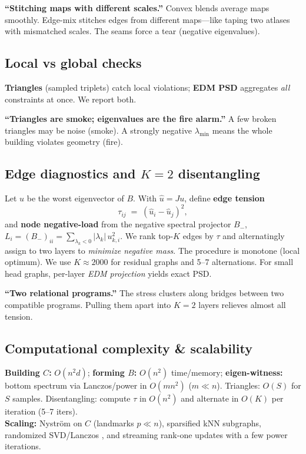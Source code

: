 \documentclass[11pt]{article}
\newcommand{\1}{\mathbf{1}}
\begin{document}
\begin{tcolorbox}[colback=blue!3,colframe=blue!40!black,title=Intuition (for \S\ref{sec:mix})]
\textbf{``Stitching maps with different scales.''} Convex blends average maps smoothly. Edge-mix stitches edges from different maps---like taping two atlases with mismatched scales. The seams force a tear (negative eigenvalues).
\end{tcolorbox}

\subsection{Local vs global checks}\label{sec:localglobal}
\textbf{Triangles} (sampled triplets) catch local violations; \textbf{EDM PSD} aggregates \emph{all} constraints at once. We report both.

\begin{tcolorbox}[colback=blue!3,colframe=blue!40!black,title=Intuition (for \S\ref{sec:localglobal})]
\textbf{``Triangles are smoke; eigenvalues are the fire alarm.''} A few broken triangles may be noise (smoke). A strongly negative $\lambda_{\min}$ means the whole building violates geometry (fire).
\end{tcolorbox}

\subsection{Edge diagnostics and $K{=}2$ disentangling}\label{sec:k2}
Let $u$ be the worst eigenvector of $B$. With $\hat u=Ju$, define \textbf{edge tension}
\[
\tau_{ij} \;=\; (\hat u_i-\hat u_j)^2,
\]
and \textbf{node negative-load} from the negative spectral projector $B_-$, $L_i=(B_-)_{ii}=\sum_{\lambda_k<0}|\lambda_k|\,u_{k,i}^2$.
We rank top-$K$ edges by $\tau$ and alternatingly assign to two layers to \emph{minimize negative mass}. The procedure is monotone (local optimum). We use $K\!\approx\!2000$ for residual graphs and 5--7 alternations. For small head graphs, per-layer \emph{EDM projection} yields exact PSD.

\begin{tcolorbox}[colback=blue!3,colframe=blue!40!black,title=Intuition (for \S\ref{sec:k2})]
\textbf{``Two relational programs.''} The stress clusters along bridges between two compatible programs. Pulling them apart into $K{=}2$ layers relieves almost all tension.
\end{tcolorbox}

\subsection{Computational complexity \& scalability}
\textbf{Building $C$:} $O(n^2d)$; \textbf{forming $B$:} $O(n^2)$ time/memory; \textbf{eigen-witness:} bottom spectrum via Lanczos/power in $O(mn^2)$ ($m\!\ll\!n$). Triangles: $O(S)$ for $S$ samples. Disentangling: compute $\tau$ in $O(n^2)$ and alternate in $O(K)$ per iteration (5--7 iters).\\
\textbf{Scaling:} Nyström on $C$ (landmarks $p\!\ll\!n$), sparsified kNN subgraphs, randomized SVD/Lanczos \citep{halko2011}, and streaming rank-one updates with a few power iterations.
\end{document}
